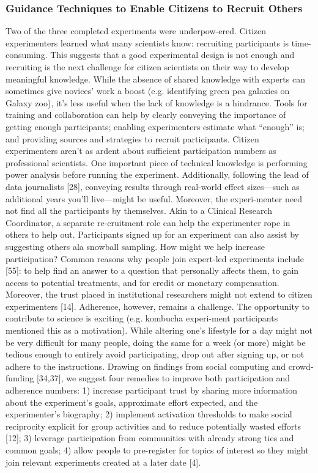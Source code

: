 \subsubsection{Guidance Techniques to Enable Citizens to Recruit Others}
Two of the three completed experiments were underpow-ered. Citizen experimenters learned what many scientists know: recruiting participants is time-consuming. This suggests that a good experimental design is not enough and recruiting is the next challenge for citizen scientists on their way to develop meaningful knowledge. While the absence of shared knowledge with experts can sometimes give novices’ work a boost (e.g. identifying green pea galaxies on Galaxy zoo), it’s less useful when the lack of knowledge is a hindrance. Tools for training and collaboration can help by clearly conveying the importance of getting enough participants; enabling experimenters estimate what “enough” is; and providing sources and strategies to recruit participants.
Citizen experimenters aren’t as ardent about sufficient participation numbers as professional scientists. One important piece of technical knowledge is performing power analysis before running the experiment. Additionally, following the lead of data journalists [28], conveying results through real-world effect sizes—such as additional years you’ll live—might be useful. Moreover, the experi-menter need not find all the participants by themselves. Akin to a Clinical Research Coordinator, a separate re-cruitment role can help the experimenter rope in others to help out. Participants signed up for an experiment can also assist by suggesting others ala snowball sampling.
How might we help increase participation? Common reasons why people join expert-led experiments include [55]: to help find an answer to a question that personally affects them, to gain access to potential treatments, and for credit or monetary compensation. Moreover, the trust placed in institutional researchers might not extend to citizen experimenters [14]. 
Adherence, however, remains a challenge. The opportunity to contribute to science is exciting (e.g. kombucha experi-ment participants mentioned this as a motivation). While altering one’s lifestyle for a day might not be very difficult for many people, doing the same for a week (or more) might be tedious enough to entirely avoid participating, drop out after signing up, or not adhere to the instructions.
Drawing on findings from social computing and crowd-funding [34,37], we suggest four remedies to improve both participation and adherence numbers: 1) increase participant trust by sharing more information about the experiment’s goals, approximate effort expected, and the experimenter’s biography; 2) implement activation thresholds to make social reciprocity explicit for group activities and to reduce potentially wasted efforts [12]; 3) leverage participation from communities with already strong ties and common goals; 4) allow people to pre-register for topics of interest so they might join relevant experiments created at a later date [4].
